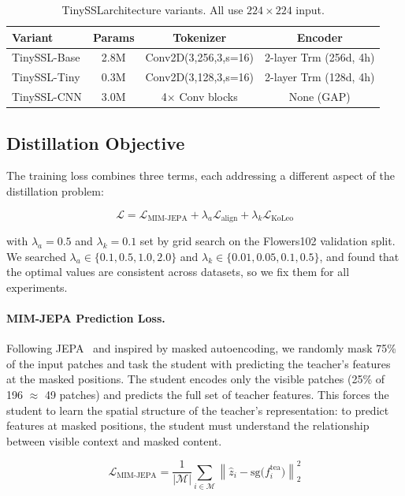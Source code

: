 \documentclass{article}
\newcommand{\method}{TinySSL}
\begin{document}
\begin{table}[ht]
\centering
\caption{\method architecture variants. All use $224 \times 224$ input.}
\label{tab:architectures}
\small
\begin{tabular}{lccc}
\toprule
Variant & Params & Tokenizer & Encoder \\
\midrule
\method-Base & 2.8M & Conv2D(3,256,3,s=16) & 2-layer Trm (256d, 4h) \\
\method-Tiny & 0.3M & Conv2D(3,128,3,s=16) & 2-layer Trm (128d, 4h) \\
\method-CNN  & 3.0M & 4$\times$ Conv blocks & None (GAP) \\
\bottomrule
\end{tabular}
\end{table}

\subsection{Distillation Objective}

The training loss combines three terms, each addressing a different aspect of the distillation problem:

\begin{equation}
    \mathcal{L} = \mathcal{L}_{\text{MIM-JEPA}} + \lambda_a \mathcal{L}_{\text{align}} + \lambda_k \mathcal{L}_{\text{KoLeo}}
\end{equation}

with $\lambda_a = 0.5$ and $\lambda_k = 0.1$ set by grid search on the Flowers102 validation split. We searched $\lambda_a \in \{0.1, 0.5, 1.0, 2.0\}$ and $\lambda_k \in \{0.01, 0.05, 0.1, 0.5\}$, and found that the optimal values are consistent across datasets, so we fix them for all experiments.

\paragraph{MIM-JEPA Prediction Loss.}
Following JEPA~\cite{jepa} and inspired by masked autoencoding, we randomly mask 75\% of the input patches and task the student with predicting the teacher's features at the masked positions. The student encodes only the visible patches (25\% of 196 $\approx$ 49 patches) and predicts the full set of teacher features. This forces the student to learn the spatial structure of the teacher's representation: to predict features at masked positions, the student must understand the relationship between visible context and masked content.

\begin{equation}
    \mathcal{L}_{\text{MIM-JEPA}} = \frac{1}{|\mathcal{M}|} \sum_{i \in \mathcal{M}} \left\| \hat{z}_i - \text{sg}\big(f_i^{\text{tea}}\big) \right\|_2^2
\end{equation}
\end{document}
